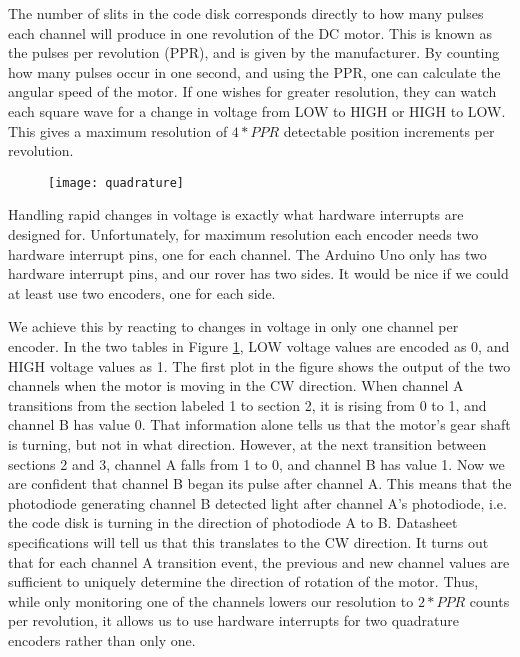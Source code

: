 The number of slits in the code disk corresponds directly to how many pulses each channel will produce in one revolution of the DC motor. This is known as the pulses per revolution (PPR), and is given by the manufacturer. By counting how many pulses occur in one second, and using the PPR, one can calculate the angular speed of the motor. If one wishes for greater resolution, they can watch each square wave for a change in voltage from LOW to HIGH or HIGH to LOW. This gives a maximum resolution of \(4 * PPR\) detectable position increments per revolution.

\begin{figure}[h]
	\caption{\cite{encoderBlog}}
	\centering
	\texttt{[image: quadrature]}
	\label{FigQuadChannels}
\end{figure}

Handling rapid changes in voltage is exactly what hardware interrupts are designed for. Unfortunately, for maximum resolution each encoder needs two hardware interrupt pins, one for each channel. The Arduino Uno only has two hardware interrupt pins, and our rover has two sides. It would be nice if we could at least use two encoders, one for each side.

We achieve this by reacting to changes in voltage in only one channel per encoder. In the two tables in Figure \ref{FigQuadChannels}, LOW voltage values are encoded as 0, and HIGH voltage values as 1. The first plot in the figure shows the output of the two channels when the motor is moving in the CW direction.  When channel A transitions from the section labeled 1 to section 2, it is rising from 0 to 1, and channel B has value 0. That information alone tells us that the motor's gear shaft is turning, but not in what direction. However, at the next transition between sections 2 and 3, channel A falls from 1 to 0, and channel B has value 1. Now we are confident that channel B began its pulse after channel A. This means that the photodiode generating channel B detected light after channel A's photodiode, i.e. the code disk is turning in the direction of photodiode A to B. Datasheet specifications will tell us that this translates to the CW direction. It turns out that for each channel A transition event, the previous and new channel values are sufficient to uniquely determine the direction of rotation of the motor. Thus, while only monitoring one of the channels lowers our resolution to \(2 * PPR\) counts per revolution, it allows us to use hardware interrupts for two quadrature encoders rather than only one. \cite{encoderBlog}

